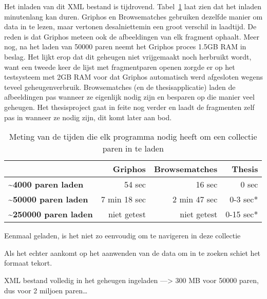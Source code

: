 Het inladen van dit XML bestand is tijdrovend. Tabel~\ref{table:matchesloadspeed} laat zien dat het inladen minutenlang kan duren. Griphos en Browsematches gebruiken dezelfde manier om data in te lezen, maar vertonen desalniettemin een groot verschil in laadtijd. De reden is dat Griphos meteen ook de afbeeldingen van elk fragment ophaalt. Meer nog, na het laden van 50000 paren neemt het Griphos proces 1.5GB RAM in beslag. Het lijkt erop dat dit geheugen niet vrijgemaakt noch herbruikt wordt, want een tweede keer de lijst met fragmentparen openen zorgde er op het testsysteem met 2GB RAM voor dat Griphos automatisch werd afgesloten wegens teveel geheugenverbruik. Browsematches (en de thesisapplicatie) laden de afbeeldingen pas wanneer ze eigenlijk nodig zijn en besparen op die manier veel geheugen. Het thesisproject gaat in feite nog verder en laadt de fragmenten zelf pas in wanneer ze nodig zijn, dit komt later aan bod.

\begin{table}[h]
	\begin{center}
		\begin{tabular}{|l|r|r|r|}
		    \rowcolor{gray!75}
		    \hline
		    & \textbf{Griphos} &  \textbf{Browsematches} & \textbf{Thesis} \\
		    \hline
		    \textbf{\textasciitilde 4000 paren laden} & 54 sec & 16 sec & 0 sec \\
		    \textbf{\textasciitilde 50000 paren laden} & 7 min 18 sec & 2 min 47 sec  & 0-3 sec* \\
		    \textbf{\textasciitilde 250000 paren laden} & niet getest & niet getest & 0-15 sec* \\
		    \hline
		\end{tabular}
	\end{center}
	\caption{Meting van de tijden die elk programma nodig heeft om een collectie paren in te laden}
	\label{table:matchesloadspeed}
\end{table}

Eenmaal geladen, is het niet zo eenvoudig om te navigeren in deze collectie

Als het echter aankomt op het aanwenden van de data om in te zoeken schiet het formaat tekort.



XML bestand volledig in het geheugen ingeladen ---> 300 MB voor 50000 paren, dus voor 2 miljoen paren\ldots

